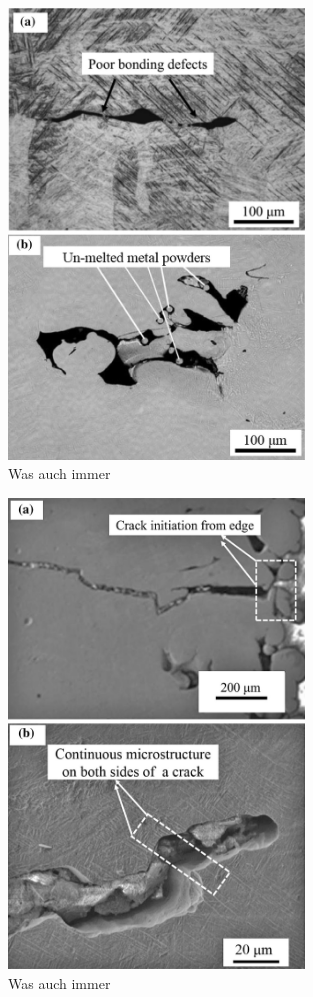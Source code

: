		\begin{figure}[ht]
			\centering
			\includegraphics[width=0.7\textwidth]{chapter/main/img/defects/lack_of_fusion.png}
			\caption{Was auch immer \cite{zhang2017defect}}
			\label{fig:defects_lof}
		\end{figure}

		\begin{figure}[ht]
			\centering
			\includegraphics[width=0.7\textwidth]{chapter/main/img/defects/cracks.png}
			\caption{Was auch immer \cite{zhang2017defect}}
			\label{fig:defects_cracks}
		\end{figure}

